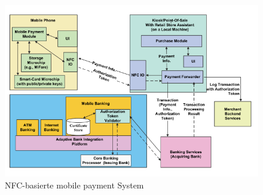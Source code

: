 \begin{figure}[h!]
	\caption{NFC-basierte mobile payment System}
	\centering
	\includegraphics[scale=0.9]{figures/NFCmobilepayment}
\end{figure}